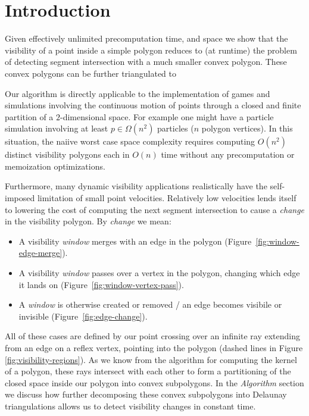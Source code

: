 \section{Introduction} \label{sec:intro}

Given effectively unlimited precomputation time, and space we show
that the visibility of a point inside a simple polygon reduces to
(at runtime) the problem of detecting segment intersection with a
much smaller convex polygon. These convex polygons can be further
triangulated to 

Our algorithm is directly applicable to the implementation
of games and simulations involving the continuous motion of points
through a closed and finite partition of a $2$-dimensional space.
For example one might have a particle simulation involving at least
$p \in \Omega(n^2)$ particles ($n$ polygon vertices). In this situation,
the naiive worst case space complexity requires computing $O(n^2)$
distinct visibility polygons each in $O(n)$ time without any
precomputation or memoization optimizations.

Furthermore, many dynamic visibility applications realistically have
the self-imposed limitation of small point velocities. Relatively
low velocities lends itself to lowering the cost of computing the
next segment intersection to cause a \emph{change} in the visibility
polygon. By \emph{change} we mean:

\begin{itemize}
\item A visibility \emph{window} merges with an edge in the polygon
(Figure~\ref{fig:window-edge-merge}).
\item A visibility \emph{window} passes over a vertex in the polygon,
changing which edge it lands on (Figure~\ref{fig:window-vertex-pass}).
\item A \emph{window} is otherwise created or removed / an edge becomes
visibile or invisible (Figure~\ref{fig:edge-change}).
\end{itemize}

All of these cases are defined by our point crossing over an infinite ray
extending from an edge on a reflex vertex, pointing into the polygon
(dashed lines in Figure \ref{fig:visibility-regions}). As we know from the algorithm
for computing the kernel of a polygon, these rays intersect with each
other to form a partitioning of the closed space inside our polygon
into convex subpolygons. In the \emph{Algorithm} section we discuss how
further decomposing these convex subpolygons into Delaunay triangulations
allows us to detect visibility changes in constant time.

